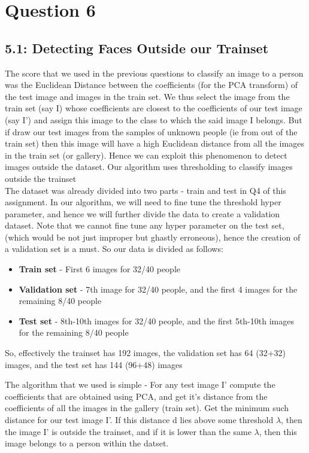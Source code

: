 \documentclass[12pt, a4paper]{article}
\begin{document}
\vspace*{-22pt}
\section*{Question 6}
\subsection*{5.1: Detecting Faces Outside our Trainset}
\quad The score that we used in the previous questions to classify an image to a person was the Euclidean Distance between the coefficients (for the PCA transform) of the test image and images in the train set. We thus select the image from the train set (say I) whose coefficients are closest to the coefficients of our test image (say I') and assign this image to the class to which the said image I belongs. But if draw our test images from the samples of unknown people (ie from out of the train set) then this image will have a high Euclidean distance from all the images in the train set (or gallery). Hence we can exploit this phenomenon to detect images outside the dataset. Our algorithm uses thresholding to classify images outside the trainset\\
\null\quad The dataset was already divided into two parts - train and test in Q4 of this assignment. In our algorithm, we will need to fine tune the threshold hyper parameter, and hence we will further divide the data to create a validation dataset. Note that we cannot fine tune any hyper parameter on the test set, (which would be not just improper but ghastly erroneous), hence the creation of a validation set is a must. So our data is divided as follows: 
\begin{itemize}
\item \textbf{Train set} - First 6 images for 32/40 people
\item \textbf{Validation set} - 7th image for 32/40 people, and the first 4 images for the remaining 8/40 people
\item \textbf{Test set} - 8th-10th images for 32/40 people, and the first 5th-10th images for the remaining 8/40 people
\end{itemize}

So, effectively the trainset has 192 images, the validation set has 64 (32+32) images, and the test set has 144 (96+48) images

The algorithm that we used is simple - For any test image I' compute the coefficients that are obtained using PCA, and get it's distance from the coefficients of all the images in the gallery (train set). Get the minimum such distance for our test image I'. If this distance d lies above some threshold $\lambda$, then the image I' is outside the trainset, and if it is lower than the same $\lambda$, then this image belongs to a person within the datset.
\end{document}
